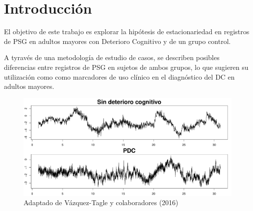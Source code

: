 \chapter{Introducci\'on}

El objetivo de este trabajo es explorar la hip\'otesis de estacionariedad en registros
de PSG en adultos mayores con Deterioro Cognitivo y de
un grupo control.

A tyrav\'es de una metodolog\'ia de estudio de casos, se describen posibles diferencias entre 
registros 
de PSG en sujetos de ambos grupos, lo que sugieren su utilizaci\'on como
como marcadores de uso cl\'inico en el diagn\'ostico del DC en adultos mayores.

%
%
%

\begin{figure}[h]
\centering
\includegraphics[width=.8\linewidth]{graficaintro.pdf}
\caption{Adaptado de V\'azquez-Tagle y colaboradores (2016)}
\end{figure}


